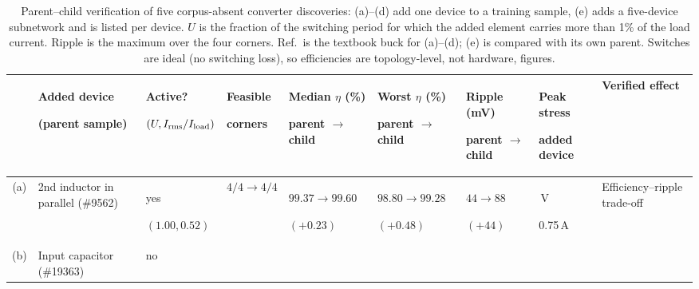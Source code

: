 \begin{table}[t]
\centering
\caption{Parent--child verification of five corpus-absent converter
discoveries: (a)--(d) add one device to a training sample, (e) adds a
five-device subnetwork and is listed per device. $U$ is the fraction of the
switching period for which the added element carries more than 1\% of the
load current. Ripple is the maximum over the four corners. Ref.\ is the
textbook buck for (a)--(d); (e) is compared with its own parent. Switches are
ideal (no switching loss), so efficiencies are topology-level, not hardware,
figures.}
\label{tab:conv_parent_child}

\footnotesize
\setlength{\tabcolsep}{2pt}
\renewcommand{\arraystretch}{1.12}

\begin{tabular}{@{}
c
p{2.45cm}
p{1.75cm}
p{1.45cm}
p{2.05cm}
p{2.05cm}
p{1.65cm}
p{1.65cm}
p{2.30cm}
@{}}
\toprule

&
\centering\textbf{Added device}\par
\centering\textbf{(parent sample)}
&
\centering\textbf{Active?}\par
\centering$(U,I_{\rm rms}/I_{\rm load})$
&
\centering\textbf{Feasible}\par
\centering\textbf{corners}
&
\centering\textbf{Median $\eta$ (\%)}\par
\centering parent $\rightarrow$ child
&
\centering\textbf{Worst $\eta$ (\%)}\par
\centering parent $\rightarrow$ child
&
\centering\textbf{Ripple (mV)}\par
\centering parent $\rightarrow$ child
&
\centering\textbf{Peak stress}\par
\centering\textbf{added device}
&
\centering\textbf{Verified effect}
\tabularnewline

\midrule

(a)
&
2nd inductor in parallel (\#9562)
&
\centering yes

$(1.00,0.52)$
&
\centering $4/4 \rightarrow 4/4$
&
\centering $99.37 \rightarrow \mathbf{99.60}$

$(+0.23)$
&
\centering $98.80 \rightarrow \mathbf{99.28}$

$(+0.48)$
&
\centering $44 \rightarrow 88$

$(+44)$
&
\centering 50\,V

0.75\,A
&
\centering Efficiency--ripple trade-off
\tabularnewline

\midrule

(b)
&
Input capacitor (\#19363)
&
\centering no


\end{tabular}
\end{table}
